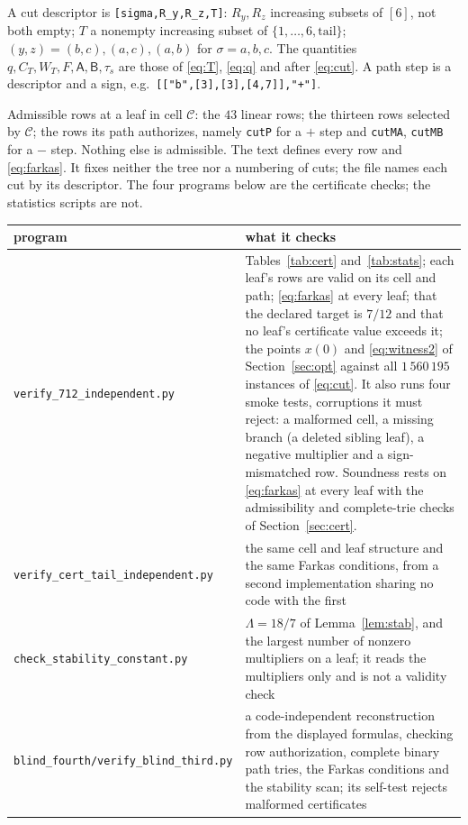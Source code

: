 \documentclass{amsart}
\numberwithin{equation}{section}
\numberwithin{table}{section}
\begin{document}
A cut descriptor is \texttt{[sigma,R\_y,R\_z,T]}: $R_y,R_z$ increasing
subsets of $[6]$, not both empty; $T$ a nonempty increasing subset of
$\{1,\ldots,6,\mathrm{tail}\}$; $(y,z)=(b,c),(a,c),(a,b)$ for
$\sigma=a,b,c$. The quantities $q,C_T,W_T,F,\mathsf A,\mathsf B,\tau_s$ are
those of \eqref{eq:T}, \eqref{eq:q} and after \eqref{eq:cut}. A path step is a
descriptor and a sign, e.g.\ \texttt{[["b",[3],[3],[4,7]],"+"]}.

Admissible rows at a leaf in cell $\mathcal C$: the $43$ linear rows; the
thirteen rows selected by $\mathcal C$; the rows its path authorizes, namely
\texttt{cutP} for a $+$ step and \texttt{cutMA}, \texttt{cutMB} for a $-$ step.
Nothing else is admissible. The text defines every row and \eqref{eq:farkas}.
It fixes neither the tree nor a numbering of cuts; the file names each cut by
its descriptor. The four programs below are the certificate checks; the
statistics scripts are not.

\begin{center}\small
\begin{tabular}{@{}>{\raggedright\arraybackslash}p{}>{\raggedright\arraybackslash}p{}@{}}
\hline program & what it checks\\\hline
\texttt{verify\_712\_}\penalty0\texttt{independent.py} &
 Tables~\ref{tab:cert} and~\ref{tab:stats}; each leaf's rows are valid on its cell and path;
 \eqref{eq:farkas} at every leaf; that the declared target is $7/12$ and that no
 leaf's certificate value exceeds it; the points $x(0)$ and \eqref{eq:witness2} of Section~\ref{sec:opt}
 against all $1\,560\,195$ instances of \eqref{eq:cut}. It also runs four smoke
 tests, corruptions it must reject: a malformed cell, a missing branch (a
 deleted sibling leaf), a negative multiplier and a sign-mismatched row.
 Soundness rests on \eqref{eq:farkas} at every leaf with the admissibility and
 complete-trie checks of Section~\ref{sec:cert}.\\
\texttt{verify\_cert\_tail\_}\penalty0\texttt{independent.py} &
 the same cell and leaf structure and the same Farkas conditions, from a second
 implementation sharing no code with the first\\
\texttt{check\_stability\_}\penalty0\texttt{constant.py} &
 $\Lambda=18/7$ of Lemma~\ref{lem:stab}, and the largest number of nonzero
 multipliers on a leaf; it reads the multipliers only and is not a validity
 check\\
\texttt{blind\_fourth/}\allowbreak\texttt{verify\_blind\_}\allowbreak\texttt{third.py} &
 a code-independent reconstruction from the displayed formulas, checking row
 authorization, complete binary path tries, the Farkas conditions and the
 stability scan; its self-test rejects malformed certificates\\
\hline
\end{tabular}
\end{center}
\end{document}
